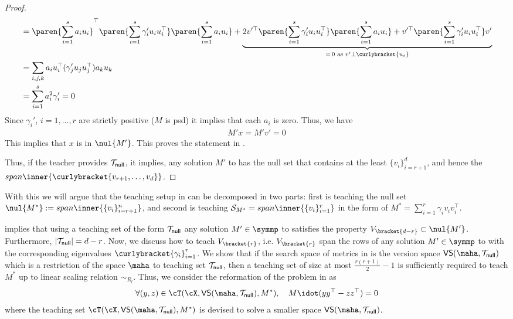\begin{proof}
\begin{align*}
       & = \paren{\sum_{i=1}^s a_iu_i}^{\top}\paren{\sum_{i = 1}^{s} \gamma_i'u_iu_i^{\top}}\paren{\sum_{i=1}^s a_iu_i } + \underbrace{2v'^{\top}\paren{\sum_{i = 1}^{s} \gamma_i'u_iu_i^{\top}}\paren{\sum_{i=1}^s a_iu_i} + v'^{\top}\paren{\sum_{i = 1}^{s} \gamma_i'u_iu_i^{\top}}v'}_{ =\, 0 \textnormal{ as } v' \bot \curlybracket{u_i}} \\
       & = \sum_{i,j,k} a_i u_i^{\top} (\gamma_j'u_ju_j^{\top}) a_k u_k\\
       & =\sum_{i=1}^s a_i^2\gamma_i' = 0
    \end{align*}
    Since $\gamma_i'$, $i = 1,\ldots,r$ are strictly positive ($M$ is psd) it implies that each $a_i$ is zero. Thus, we have
    \begin{align*}
        M'x = M'v' = 0
    \end{align*}
    This implies that $x$ is in $\nul{M'}$. This proves the statement in .
    
    Thus, if the teacher provides $\mathcal{T}_{\sf{null}}$, 
    it implies, any solution $M'$ to  has the null set that contains at the least $\{v_i\}_{i=r+1}^d$, and hence the $span \inner{\curlybracket{v_{r+1},\ldots,v_d}}$. 
\end{proof}

With this we will argue that the teaching setup in  can be decomposed in two parts: first is teaching the null set $ \nul{M^*}:= span \inner{\{v_i\}_{i=r+1}^n}$, and second is teaching $\mathcal{S}_{M^*} = span \inner{\{v_i\}_{i=1}^r}$ in the form of $M^* = \sum_{i=1}^r \gamma_i v_iv_i^{\top}$. 

 implies that using a teaching set of the form $\mathcal{T}_{\sf {null}}$ any solution $M' \in \symmp$ to  satisfies the property $V_{\bracket{d - r}} \subset \nul{M'}$. Furthermore, $|\mathcal{T}_{\sf {null}}| = d - r$. Now, we discuss how to teach $V_{\bracket{r}}$, i.e. $V_{\bracket{r}}$ span the rows of any solution $M' \in \symmp$ to  with the corresponding eigenvalues $\curlybracket{\gamma_i}_{i=1}^r$. We show that if the search space of metrics in  is the version space $\textsf{VS}(\maha,\mathcal{T}_{\sf {null}})$  which is a restriction of the space $\maha$ to teaching set $\mathcal{T}_{\sf {null}}$, then a teaching set of size at most $\frac{r(r+1)}{2} -1$ is sufficiently required to teach $M^*$ up to linear scaling relation $\sim_{R_l}$. Thus, we consider the reformation of the problem in  as 
\begin{align}
  \forall (y,z) \in \cT(\cX,\textsf{VS}(\maha,\mathcal{T}_{\sf {null}}),M^*), \quad M \idot (yy^{\top} - zz^{\top})  = 0  \label{eq: redorthosat}
\end{align}
where the teaching set $\cT(\cX,\textsf{VS}(\maha,\mathcal{T}_{\sf {null}}),M^*)$ is devised to solve a smaller space $\textsf{VS}(\maha,\mathcal{T}_{\sf {null}})$.

